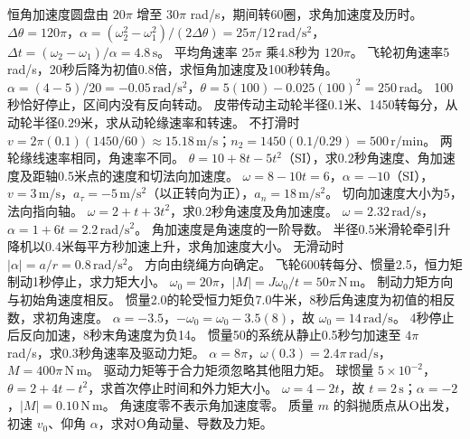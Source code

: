 \problemtext 恒角加速度圆盘由 $20\pi$ 增至 $30\pi$ rad/s，期间转60圈，求角加速度及历时。
\workings $\Delta\theta=120\pi$，$\alpha=(\omega_2^2-\omega_1^2)/(2\Delta\theta)=25\pi/12\,\mathrm{rad/s^2}$，$\Delta t=(\omega_2-\omega_1)/\alpha=4.8\,\mathrm s$。
\crosscheck 平均角速率 $25\pi$ 乘4.8秒为 $120\pi$。
\problemtext 飞轮初角速率5 rad/s，20秒后降为初值0.8倍，求恒角加速度及100秒转角。
\workings $\alpha=(4-5)/20=-0.05\,\mathrm{rad/s^2}$，$\theta=5(100)-0.025(100)^2=250\,\mathrm{rad}$。
\crosscheck 100秒恰好停止，区间内没有反向转动。
\problemtext 皮带传动主动轮半径0.1米、1450转每分，从动轮半径0.29米，求从动轮缘速率和转速。
\workings 不打滑时 $v=2\pi(0.1)(1450/60)\approx15.18\,\mathrm{m/s}$；$n_2=1450(0.1/0.29)=500\,\mathrm{r/min}$。
\crosscheck 两轮缘线速率相同，角速率不同。
\problemtext $\theta=10+8t-5t^2$（SI），求0.2秒角速度、角加速度及距轴0.5米点的速度和切法向加速度。
\workings $\omega=8-10t=6$，$\alpha=-10$（SI），$v=3\,\mathrm{m/s}$，$a_\tau=-5\,\mathrm{m/s^2}$（以正转向为正），$a_n=18\,\mathrm{m/s^2}$。
\crosscheck 切向加速度大小为5，法向指向轴。
\problemtext $\omega=2+t+3t^2$，求0.2秒角速度及角加速度。
\workings $\omega=2.32\,\mathrm{rad/s}$，$\alpha=1+6t=2.2\,\mathrm{rad/s^2}$。
\crosscheck 角加速度是角速度的一阶导数。
\problemtext 半径0.5米滑轮牵引升降机以0.4米每平方秒加速上升，求角加速度大小。
\workings 无滑动时 $|\alpha|=a/r=0.8\,\mathrm{rad/s^2}$。
\crosscheck 方向由绕绳方向确定。
\problemtext 飞轮600转每分、惯量2.5，恒力矩制动1秒停止，求力矩大小。
\workings $\omega_0=20\pi$，$|M|=J\omega_0/t=50\pi\,\mathrm{N\,m}$。
\crosscheck 制动力矩方向与初始角速度相反。
\problemtext 惯量2.0的轮受恒力矩负7.0牛米，8秒后角速度为初值的相反数，求初角速度。
\workings $\alpha=-3.5$，$-\omega_0=\omega_0-3.5(8)$，故 $\omega_0=14\,\mathrm{rad/s}$。
\crosscheck 4秒停止后反向加速，8秒末角速度为负14。
\problemtext 惯量50的系统从静止0.5秒匀加速至 $4\pi$ rad/s，求0.3秒角速率及驱动力矩。
\workings $\alpha=8\pi$，$\omega(0.3)=2.4\pi\,\mathrm{rad/s}$，$M=400\pi\,\mathrm{N\,m}$。
\crosscheck 驱动力矩等于合力矩须忽略其他阻力矩。
\problemtext 球惯量 $5\times10^{-2}$，$\theta=2+4t-t^2$，求首次停止时间和外力矩大小。
\workings $\omega=4-2t$，故 $t=2\,\mathrm s$；$\alpha=-2$，$|M|=0.10\,\mathrm{N\,m}$。
\crosscheck 角速度零不表示角加速度零。
\problemtext 质量 $m$ 的斜抛质点从O出发，初速 $v_0$、仰角 $\alpha$，求对O角动量、导数及力矩。
